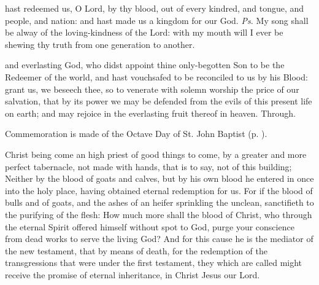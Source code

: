 \introit
{} hast redeemed us, O Lord, by thy blood, out of every kindred, and tongue, and people, and nation: and hast made us a kingdom for our God. \textit{Ps.} My song shall be alway of the loving-kindness of the Lord: with my mouth will I ever be shewing thy truth from one generation to another.

\collect
{} and everlasting God, who didst appoint thine only-begotten Son to be the Redeemer of the world, and hast vouchsafed to be reconciled to us by his Blood: grant us, we beseech thee, so to venerate with solemn worship the price of our salvation, that by its power we may be defended from the evils of this present life on earth; and may rejoice in the everlasting fruit thereof in heaven. Through.
\begin{rubric}
    Commemoration is made of the Octave Day of St. John Baptist (p. \pageref{JohnCollect}).
\end{rubric}

 Christ being come an high priest of good things to come, by a greater and more perfect tabernacle, not made with hands, that is to say, not of this building; Neither by the blood of goats and calves, but by his own blood he entered in once into the holy place, having obtained eternal redemption for us. For if the blood of bulls and of goats, and the ashes of an heifer sprinkling the unclean, sanctifieth to the purifying of the flesh: How much more shall the blood of Christ, who through the eternal Spirit offered himself without spot to God, purge your conscience from dead works to serve the living God? And for this cause he is the mediator of the new testament, that by means of death, for the redemption of the transgressions that were under the first testament, they which are called might receive the promise of eternal inheritance, %
in Christ Jesus our Lord.




